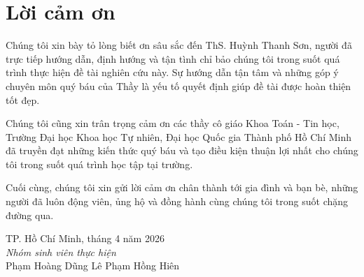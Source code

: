 \chapter*{Lời cảm ơn}

Chúng tôi xin bày tỏ lòng biết ơn sâu sắc đến ThS. Huỳnh Thanh Sơn, người đã trực tiếp hướng dẫn, định hướng và tận tình chỉ bảo chúng tôi trong suốt quá trình thực hiện đề tài nghiên cứu này. Sự hướng dẫn tận tâm và những góp ý chuyên môn quý báu của Thầy là yếu tố quyết định giúp đề tài được hoàn thiện tốt đẹp.

Chúng tôi cũng xin trân trọng cảm ơn các thầy cô giáo Khoa Toán - Tin học, Trường Đại học Khoa học Tự nhiên, Đại học Quốc gia Thành phố Hồ Chí Minh đã truyền đạt những kiến thức quý báu và tạo điều kiện thuận lợi nhất cho chúng tôi trong suốt quá trình học tập tại trường.

Cuối cùng, chúng tôi xin gửi lời cảm ơn chân thành tới gia đình và bạn bè, những người đã luôn động viên, ủng hộ và đồng hành cùng chúng tôi trong suốt chặng đường qua.

\vspace{1.5cm}
\begin{flushright}
TP. Hồ Chí Minh, tháng 4 năm 2026\\[0.3cm]
\textit{Nhóm sinh viên thực hiện}\\[1.5cm]
Phạm Hoàng Dũng \qquad\qquad Lê Phạm Hồng Hiên
\end{flushright}
